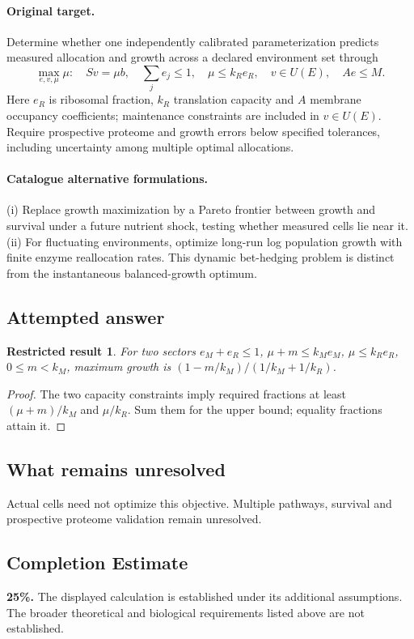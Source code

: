 \documentclass[11pt]{article}
\newtheorem{attemptresult}{Restricted result}[section]
\begin{document}
\paragraph{Original target.}
Determine whether one independently calibrated parameterization predicts measured allocation and growth across a declared environment set through
\[\max_{e,v,\mu}\mu:\quad Sv=\mu b,\quad \sum_j e_j\le1,\quad \mu\le k_R e_R,\quad v\in U(E),\quad A e\le M.\]
Here $e_R$ is ribosomal fraction, $k_R$ translation capacity and $A$ membrane occupancy coefficients; maintenance constraints are included in $v\in U(E)$. Require prospective proteome and growth errors below specified tolerances, including uncertainty among multiple optimal allocations.
\paragraph{Catalogue alternative formulations.}
(i) Replace growth maximization by a Pareto frontier between growth and survival under a future nutrient shock, testing whether measured cells lie near it. (ii) For fluctuating environments, optimize long-run log population growth with finite enzyme reallocation rates. This dynamic bet-hedging problem is distinct from the instantaneous balanced-growth optimum.
\subsection{Attempted answer}
\begin{attemptresult}
For two sectors $e_M+e_R\leq1$, $\mu+m\leq k_Me_M$, $\mu\leq k_Re_R$, $0\leq m<k_M$, maximum growth is $(1-m/k_M)/(1/k_M+1/k_R)$.
\end{attemptresult}
\begin{proof}
The two capacity constraints imply required fractions at least $(\mu+m)/k_M$ and $\mu/k_R$. Sum them for the upper bound; equality fractions attain it.
\end{proof}
\subsection{What remains unresolved}
Actual cells need not optimize this objective. Multiple pathways, survival and prospective proteome validation remain unresolved.
\subsection{Completion Estimate}
\textbf{25\%.} The displayed calculation is established under its additional assumptions. The broader theoretical and biological requirements listed above are not established.
\end{document}
